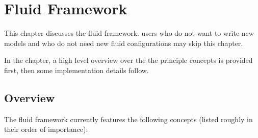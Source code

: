 \section{Fluid Framework}
\label{sec:fluidframework}

This chapter discusses the \Dumux fluid framework. \Dumux users who
do not want to write new models and who do not need new fluid
configurations may skip this chapter.

In the chapter, a high level overview over the the principle concepts
is provided first, then some implementation details follow.

\subsection{Overview}

The \Dumux fluid framework currently features the following concepts
(listed roughly in their order of importance):

